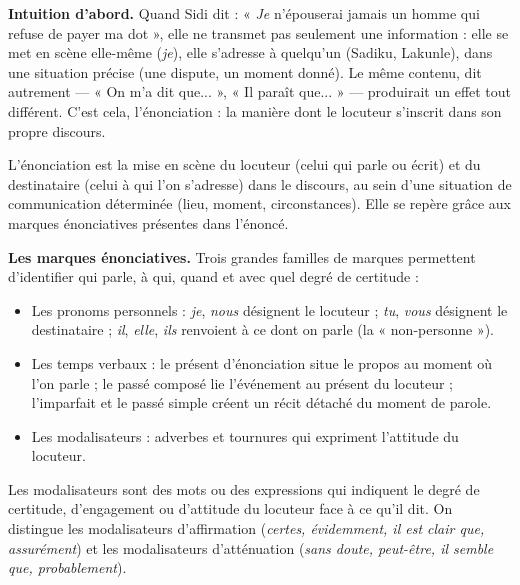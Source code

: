 \documentclass[11pt]{article}
\newcommand{\cle}[1]{{\popxbold\color{popdark}#1}}
\newcounter{popsec}
\newcounter{popsub}
\newcommand{\courssub}[1]{%
  \stepcounter{popsub}%
  \par\vspace{9pt}\noindent{\popxbold\fontsize{11.5}{13}\selectfont\color{popink}{\color{poporange}\thepopsec.\thepopsub}\hspace{6pt}#1}\par\nopagebreak\vspace{4pt}
}
\begin{document}
\courssub{Communication : l'énonciation}

\textbf{Intuition d'abord.} Quand Sidi dit : « \emph{Je} n'épouserai jamais un homme qui refuse de payer ma dot », elle ne transmet pas seulement une information : elle se met en scène elle-même (\emph{je}), elle s'adresse à quelqu'un (Sadiku, Lakunle), dans une situation précise (une dispute, un moment donné). Le même contenu, dit autrement — « On m'a dit que... », « Il paraît que... » — produirait un effet tout différent. C'est cela, l'énonciation : la manière dont le locuteur s'inscrit dans son propre discours.

\begin{definition}[L'énonciation]
L'\cle{énonciation} est la mise en scène du \cle{locuteur} (celui qui parle ou écrit) et du \cle{destinataire} (celui à qui l'on s'adresse) dans le discours, au sein d'une \cle{situation de communication} déterminée (lieu, moment, circonstances). Elle se repère grâce aux \cle{marques énonciatives} présentes dans l'énoncé.
\end{definition}

\textbf{Les marques énonciatives.} Trois grandes familles de marques permettent d'identifier qui parle, à qui, quand et avec quel degré de certitude :

\begin{itemize}
\item Les \cle{pronoms personnels} : \emph{je}, \emph{nous} désignent le locuteur ; \emph{tu}, \emph{vous} désignent le destinataire ; \emph{il}, \emph{elle}, \emph{ils} renvoient à ce dont on parle (la « non-personne »).
\item Les \cle{temps verbaux} : le présent d'énonciation situe le propos au moment où l'on parle ; le passé composé lie l'événement au présent du locuteur ; l'imparfait et le passé simple créent un récit détaché du moment de parole.
\item Les \cle{modalisateurs} : adverbes et tournures qui expriment l'attitude du locuteur.
\end{itemize}

\begin{definition}
Les \cle{modalisateurs} sont des mots ou des expressions qui indiquent le degré de certitude, d'engagement ou d'attitude du locuteur face à ce qu'il dit. On distingue les modalisateurs d'\cle{affirmation} (\emph{certes, évidemment, il est clair que, assurément}) et les modalisateurs d'\cle{atténuation} (\emph{sans doute, peut-être, il semble que, probablement}).
\end{definition}
\end{document}
